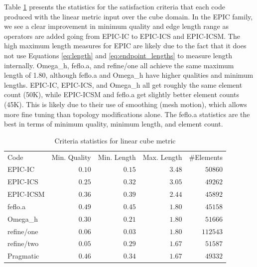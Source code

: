 \documentclass[3p,times,procedia,number]{elsarticle}
\begin{document}
Table \ref{tab:cube-linear-stats} presents the statistics
for the satisfaction criteria that each code
produced with the linear metric input over the cube domain.
In the EPIC family, we see a clear improvement in minimum
quality and edge length range as operators are added
going from EPIC-IC to EPIC-ICS and EPIC-ICSM.
The high maximum length measures for EPIC are likely due
to the fact that it does not use Equations \ref{eq:length}
and \ref{eq:endpoint_lengths} to measure length
internally.\cite{park-loseille-krakos-michal-adapt-decomposition}
Omega\_h, feflo.a, and refine/one
all achieve the same maximum length of 1.80, although
feflo.a and Omega\_h have higher qualities
and minimum lengths.
EPIC-IC, EPIC-ICS, and Omega\_h all get roughly
the same element count (50K), while EPIC-ICSM and feflo.a
get slightly better element counts (45K).
This is likely due to their use of smoothing (mesh motion),
which allows more fine tuning than topology modifications alone.
The feflo.a statistics are the best in terms of minimum
quality,
minimum length, and element count.

\begin{table}
\caption{Criteria statistics for linear cube metric}
\label{tab:cube-linear-stats}
\begin{tabular}{lrrrr}
Code & Min. Quality & Min. Length & Max. Length & \#Elements\\
EPIC-IC     & $0.10$&       $0.15$&       $3.48$&   $ 50860$\\
EPIC-ICS    & $0.25$&       $0.32$&       $3.05$&   $ 49262$\\
EPIC-ICSM   & $0.36$&       $0.39$&       $2.44$&   $ 45892$\\
feflo.a     & $0.49$&       $0.45$&       $1.80$&   $ 45158$\\
Omega\_h    & $0.30$&       $0.21$&       $1.80$&   $ 51666$\\
refine/one  & $0.06$&       $0.03$&       $1.80$&   $112543$\\
refine/two  & $0.05$&       $0.29$&       $1.67$&   $ 51587$\\
Pragmatic   & $0.46$&       $0.34$&       $1.67$&   $ 49332$\\
\end{tabular}
\end{table}
\end{document}
